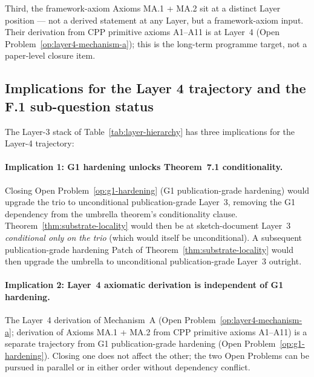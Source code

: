 \documentclass[11pt,letterpaper]{article}
\begin{document}
Third, the framework-axiom Axioms MA.1 + MA.2 sit at a distinct Layer position --- not a derived statement at any Layer, but a framework-axiom input. Their derivation from CPP primitive axioms A1--A11 is at Layer~4 (Open Problem~\ref{op:layer4-mechanism-a}); this is the long-term programme target, not a paper-level closure item.

\subsection{Implications for the Layer 4 trajectory and the F.1 sub-question status}
\label{sec:layer4-implications}

The Layer-3 stack of Table~\ref{tab:layer-hierarchy} has three implications for the Layer-4 trajectory:

\paragraph{Implication 1: G1 hardening unlocks Theorem~7.1 conditionality.}
Closing Open Problem~\ref{op:g1-hardening} (G1 publication-grade hardening) would upgrade the trio to unconditional publication-grade Layer~3, removing the G1 dependency from the umbrella theorem's conditionality clause. Theorem~\ref{thm:substrate-locality} would then be at sketch-document Layer~3 \emph{conditional only on the trio} (which would itself be unconditional). A subsequent publication-grade hardening Patch of Theorem~\ref{thm:substrate-locality} would then upgrade the umbrella to unconditional publication-grade Layer~3 outright.

\paragraph{Implication 2: Layer~4 axiomatic derivation is independent of G1 hardening.}
The Layer~4 derivation of Mechanism~A (Open Problem~\ref{op:layer4-mechanism-a}; derivation of Axioms MA.1 + MA.2 from CPP primitive axioms A1--A11) is a separate trajectory from G1 publication-grade hardening (Open Problem~\ref{op:g1-hardening}). Closing one does not affect the other; the two Open Problems can be pursued in parallel or in either order without dependency conflict.
\end{document}
